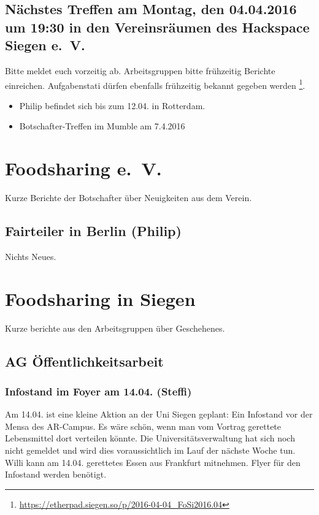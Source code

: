\documentclass{scrreprt}
\begin{document}
\section{Nächstes Treffen am Montag, den 04.04.2016 um 19:30 in den Vereinsräumen des Hackspace Siegen e.~V.}
    Bitte meldet euch vorzeitig ab. Arbeitsgruppen bitte frühzeitig Berichte einreichen. Aufgabenstati dürfen ebenfalls frühzeitig bekannt gegeben werden \footnote{\url{https://etherpad.siegen.so/p/2016-04-04_FoSi2016.04}}. 
    \begin{itemize}
    	\item Philip befindet sich bis zum 12.04. in Rotterdam.
    	\item Botschafter-Treffen im Mumble am 7.4.2016
    \end{itemize}

\chapter{Foodsharing e.~V.} Kurze Berichte der Botschafter über Neuigkeiten aus dem Verein.\par

\section{Fairteiler in Berlin (Philip)}
	Nichts Neues.
    
\chapter{Foodsharing in Siegen} Kurze berichte aus den Arbeitsgruppen über Geschehenes.

\section {AG Öffentlichkeitsarbeit}

\subsection{Infostand im Foyer am 14.04. (Steffi)}
 Am 14.04. ist eine kleine Aktion an der Uni Siegen geplant: Ein Infostand vor der Mensa des AR-Campus. Es wäre schön, wenn man vom Vortrag gerettete Lebensmittel dort verteilen könnte. Die Universitätsverwaltung hat sich noch nicht gemeldet und wird dies voraussichtlich im Lauf der nächste Woche tun. Willi kann am 14.04. gerettetes Essen aus Frankfurt mitnehmen. Flyer für den Infostand werden benötigt.
 
\end{document}
